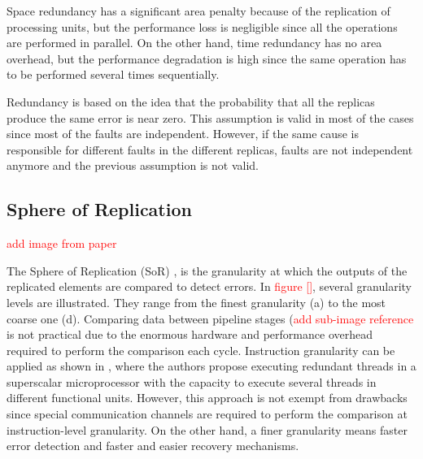 Space redundancy has a significant area penalty because of the replication of processing units, but the performance loss is negligible since all the operations are performed in parallel. On the other hand, time redundancy has no area overhead, but the performance degradation is high since the same operation has to be performed several times sequentially.

Redundancy is based on the idea that the probability that all the replicas produce the same error is near zero. This assumption is valid in most of the cases since most of the faults are independent. However, if the same cause is responsible for different faults in the different replicas, faults are not independent anymore and the previous assumption is not valid.

\bigskip


\subsection{Sphere of Replication}
\label{section:SoR}

\textcolor{red}{add image from paper}

The Sphere of Replication (SoR) \cite{hernandez2014live}, is the granularity at which the outputs of the replicated elements are compared to detect errors. In \textcolor{red}{figure []}, several granularity levels are illustrated. They range from the finest granularity (a) to the most coarse one (d). Comparing data between pipeline stages (\textcolor{red}{add sub-image reference} is not practical due to the enormous hardware and performance overhead required to perform the comparison each cycle. Instruction granularity can be applied as shown in \cite{reinhardt2000transient}, where the authors propose executing redundant threads in a superscalar microprocessor with the capacity to execute several threads in different functional units. However, this approach is not exempt from drawbacks since special communication channels are required to perform the comparison at instruction-level granularity. On the other hand, a finer granularity means faster error detection and faster and easier recovery mechanisms. 

